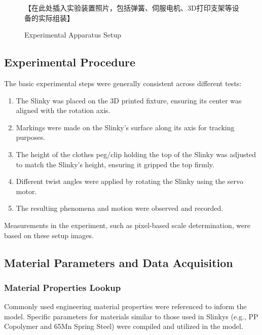 \documentclass{mcmthesis}  %
\begin{document}
\begin{figure}[h!]
    \centering
    【在此处插入实验装置照片，包括弹簧、伺服电机、3D打印支架等设备的实际组装】
    \caption{Experimental Apparatus Setup}
    \label{fig:exp_apparatus}
\end{figure}

\subsection{Experimental Procedure}
The basic experimental steps were generally consistent across different tests:
\begin{enumerate}
    \item The Slinky was placed on the 3D printed fixture, ensuring its center was aligned with the rotation axis.
    \item Markings were made on the Slinky's surface along its axis for tracking purposes.
    \item The height of the clothes peg/clip holding the top of the Slinky was adjusted to match the Slinky's height, ensuring it gripped the top firmly.
    \item Different twist angles were applied by rotating the Slinky using the servo motor.
    \item The resulting phenomena and motion were observed and recorded.
\end{enumerate}
Measurements in the experiment, such as pixel-based scale determination, were based on these setup images.

\subsection{Material Parameters and Data Acquisition}

\subsubsection{Material Properties Lookup}
Commonly used engineering material properties were referenced to inform the model. Specific parameters for materials similar to those used in Slinkys (e.g., PP Copolymer and 65Mn Spring Steel) were compiled and utilized in the model.
\end{document}
